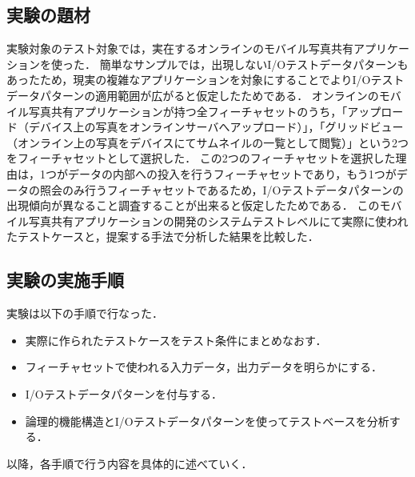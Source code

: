 \subsection{実験の題材} \label{sec:4-2-3}

実験対象のテスト対象では，実在するオンラインのモバイル写真共有アプリケーションを使った．
簡単なサンプルでは，出現しないI/Oテストデータパターンもあったため，現実の複雑なアプリケーションを対象にすることでよりI/Oテストデータパターンの適用範囲が広がると仮定したためである．
オンラインのモバイル写真共有アプリケーションが持つ全フィーチャセットのうち，「アップロード（デバイス上の写真をオンラインサーバへアップロード）」，「グリッドビュー（オンライン上の写真をデバイスにてサムネイルの一覧として閲覧）」という2つをフィーチャセットとして選択した．
この2つのフィーチャセットを選択した理由は，1つがデータの内部への投入を行うフィーチャセットであり，もう1つがデータの照会のみ行うフィーチャセットであるため，I/Oテストデータパターンの出現傾向が異なること調査することが出来ると仮定したためである．
このモバイル写真共有アプリケーションの開発のシステムテストレベルにて実際に使われたテストケースと，提案する手法で分析した結果を比較した．

\subsection{実験の実施手順}
実験は以下の手順で行なった．

\begin{itemize}
\item 実際に作られたテストケースをテスト条件にまとめなおす．
\item フィーチャセットで使われる入力データ，出力データを明らかにする．
\item I/Oテストデータパターンを付与する．
\item 論理的機能構造とI/Oテストデータパターンを使ってテストベースを分析する．
\end{itemize}

以降，各手順で行う内容を具体的に述べていく．


